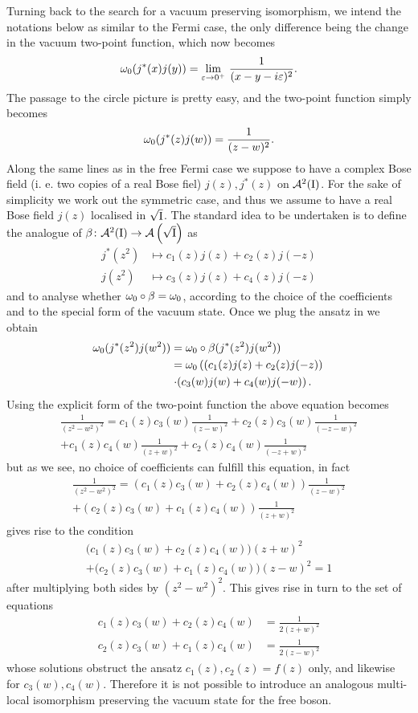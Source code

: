 Turning back to the search for a vacuum preserving isomorphism,
 we intend the notations below as similar to the Fermi case, 
 the only difference being the change in the vacuum
 two-point function, which now becomes \cite{dFMS:1997}
 \[
 \omega_0(j^*(x)j(y))=
 \lim_{\varepsilon\to 0^+}\,\frac{1}{(x-y-i\varepsilon)^2}.
 \]
  The passage to the circle picture is pretty easy, and the
 two-point function simply becomes
 \[
 \omega_0(j^*(z)j(w))=\frac{1}{(z-w)^2}.
 \]
 Along the same lines as in the free Fermi case we suppose
 to have a complex Bose field (i. e. two copies of a real
 Bose fiel) $j(z),j^*(z)$ on $\mathcal{A}^2(\textrm{I})$.
 For the sake of simplicity we work out the symmetric case,
 and thus we assume to have a real Bose field $j(z)$ 
 localised in $\sqrt{\textrm{I}}$. The standard idea to be undertaken 
 is to define the analogue
 of $\beta\colon\mathcal{A}^2(\textrm{I})\to\mathcal{A}\left(\sqrt{\textrm{I}}\right)$ as
 \begin{align*}
 j^*(z^2)&\mapsto c_1(z)j(z)+c_2(z)j(-z)\\
 j(z^2)&\mapsto c_3(z)j(z)+c_4(z)j(-z)
 \end{align*}
 and to analyse whether $\omega_0\circ\beta=\omega_0$, according
 to the choice of the coefficients and to the 
 special form of the vacuum state. Once we plug the
 ansatz in we obtain 
 \begin{align*}
 \omega_0(j^*(z^2)j(w^2))&=
 \omega_0\circ\beta(j^*(z^2)j(w^2))\\
 &=\omega_0\left((c_1(z)j(z)+c_2(z)j(-z))\right.\\ 
 &\left. \cdot(c_3(w)j(w)+c_4(w)j(-w)\right).\\
 \end{align*}
 Using the explicit form of the two-point function
 the above equation becomes 
 \begin{multline*}
 \frac{1}{(z^2-w^2)^2}=c_1(z)c_3(w)\frac{1}{(z-w)^2}+
 c_2(z)c_3(w)\frac{1}{(-z-w)^2}\\
 +c_1(z)c_4(w)\frac{1}{(z+w)^2}+c_2(z)c_4(w)\frac{1}{(-z+w)^2}
 \end{multline*}
 but as we see, no choice of coefficients can fulfill
 this equation, in fact
 \begin{multline*}
 \frac{1}{(z^2-w^2)^2}=\left(c_1(z)c_3(w)+c_2(z)c_4(w)\right)
 \frac{1}{(z-w)^2}\\
 +\left(c_2(z)c_3(w)+c_1(z)c_4(w)\right)\frac{1}{(z+w)^2}
 \end{multline*}
 gives rise to the condition
 \begin{multline*}
 \big(c_1(z)c_3(w)+c_2(z)c_4(w)\big)(z+w)^2\\+
 \big(c_2(z)c_3(w)+c_1(z)c_4(w)\big)(z-w)^2=1
 \end{multline*}
 after multiplying both sides by $(z^2-w^2)^2$.
 This gives rise in turn to the set of equations
 \begin{align*}
 c_1(z)c_3(w)+c_2(z)c_4(w)&=\frac{1}{2(z+w)^2}\\
 c_2(z)c_3(w)+c_1(z)c_4(w)&=\frac{1}{2(z-w)^2}
 \end{align*}
 whose solutions obstruct the ansatz $c_1(z),c_2(z)=
 f(z)$ only, and likewise for $c_3(w),c_4(w)$. 
 Therefore it is not possible to introduce an 
 analogous multi-local isomorphism preserving 
 the vacuum state for the free boson. 